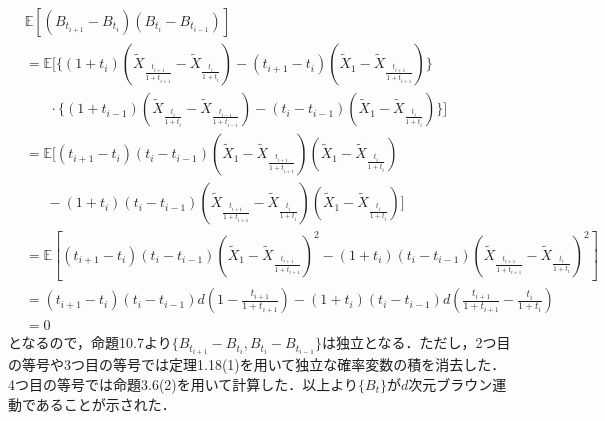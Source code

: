 \documentclass[dvipdfmx]{jsarticle}
\begin{document}
\begin{description}
\begin{align*}
&\mathbb{E}[(B_{t_{i+1}}-B_{t_i})(B_{t_i}-B_{t_{i-1}})] \\
&=\mathbb{E}[
\{(1+t_i)(\widetilde{X}_{\frac{t_{i+1}}{1+t_{i+1}}}-\widetilde{X}_{\frac{t_i}{1+t_i}})-(t_{i+1}-t_i)(\widetilde{X}_1-\widetilde{X}_{\frac{t_{i+1}}{1+t_{i+1}}})\} \\
&{\ }{\ }{\ }{\ }{\ }{\ }{\ }{\ }\cdot\{(1+t_{i-1})(\widetilde{X}_{\frac{t_i}{1+t_i}}-\widetilde{X}_{\frac{t_{i-1}}{1+t_{i-1}}})-(t_i-t_{i-1})(\widetilde{X}_1-\widetilde{X}_{\frac{t_i}{1+t_i}})\}
] \\
&=\mathbb{E}[(t_{i+1}-t_i)(t_i-t_{i-1})(\widetilde{X}_1-\widetilde{X}_{\frac{t_{i+1}}{1+t_{i+1}}})(\widetilde{X}_1-\widetilde{X}_{\frac{t_i}{1+t_i}}) \\
&{\ }{\ }{\ }{\ }{\ }{\ }{\ }-(1+t_i)(t_i-t_{i-1})(\widetilde{X}_{\frac{t_{i+1}}{1+t_{i+1}}}-\widetilde{X}_{\frac{t_i}{1+t_i}})(\widetilde{X}_1-\widetilde{X}_{\frac{t_i}{1+t_i}})] \\
&=\mathbb{E}[(t_{i+1}-t_i)(t_i-t_{i-1})(\widetilde{X}_1-\widetilde{X}_{\frac{t_{i+1}}{1+t_{i+1}}})^2-(1+t_i)(t_i-t_{i-1})(\widetilde{X}_{\frac{t_{i+1}}{1+t_{i+1}}}-\widetilde{X}_{\frac{t_i}{1+t_i}})^2] \\
&=(t_{i+1}-t_i)(t_i-t_{i-1})d\left(1-\frac{t_{i+1}}{1+t_{i+1}}\right)-(1+t_i)(t_i-t_{i-1})d\left(\frac{t_{i+1}}{1+t_{i+1}}-\frac{t_i}{1+t_i}\right) \\
&=0
\end{align*}
となるので，\cite{kotani}命題10.7より$\{B_{t_{i+1}}-B_{t_i},B_{t_i}-B_{t_{i-1}}\}$は独立となる．ただし，2つ目の等号や3つ目の等号では\cite{taniguchi}定理1.18(1)を用いて独立な確率変数の積を消去した．4つ目の等号では\cite{taniguchi}命題3.6(2)を用いて計算した．以上より$\{B_t\}$が$d$次元ブラウン運動であることが示された．
\end{description}
%
%
%
%
\end{document}
